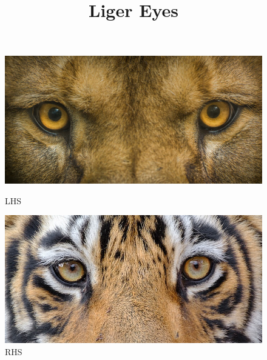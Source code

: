 \documentclass{article}
\begin{document}
\title{Liger Eyes}
\begin{figure}[!htb]
    \includegraphics[width=\linewidth]{lionface.jpeg}
    \caption{LHS}
\endminipage
{}
    \includegraphics[width=\linewidth]{tigerface.jpg}
    \caption{RHS}
\endminipage
\end{figure}
\end{document}

